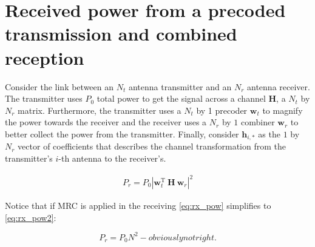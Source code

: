 




\section{Received power from a precoded transmission and combined reception}
Consider the link between an $N_t$ antenna transmitter and an $N_r$ antenna receiver. The transmitter uses $P_0$ total power to get the signal across a channel $\bm{H}$, a $N_t$ by $N_r$ matrix. Furthermore, the transmitter uses a $N_t$ by 1 precoder $\bm{w}_t$ to magnify the power towards the receiver and the receiver uses a $N_r$ by $1$ combiner $\bm{w}_r$ to better collect the power from the transmitter. Finally, consider $\bm{h}_{i,*}$ as the $1$ by $N_r$ vector of coefficients that describes the channel transformation from the transmitter's $i$-th antenna to the receiver's.


\begin{align} \label{eq:rx_pow}
    P_r = P_0 \left|\bm{w}_t^\text{T} \ \bm{H} \ \bm{w}_r \right|^2 
\end{align}


\begin{comment}
This is wrong!

    \begin{align}
        
    &= P_0 \sum_{i=1}^{N_t} \left|  \bm{w}_{t_i} \bm{h}_{i,*} \ \bm{w}_r \right|^2 = \\
    &= P_0 \mathlarger{\sum}_{i=1}^{N_t} \left| \bm{w}_{t_i} \right|^2 \sum_{j=1}^{N_r} \left| \bm{h}_{i,j} \ \bm{w}_{r_j} \right|^2 = \\
    &= d
    \end{align}
\end{comment}

Notice that if MRC is applied in the receiving \eqref{eq:rx_pow} simplifies to \eqref{eq:rx_pow2}:

\begin{equation}
    P_r = P_0 N^2 - obviously not right.
\end{equation}


